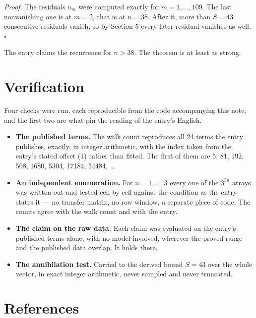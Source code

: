 \documentclass[11pt]{article}
\theoremstyle{definition}
\begin{document}
{\itshape Proof.} The residuals $u_m$ were computed exactly for $m = 1,\dots,109$. The last nonvanishing one is at $m = 2$, that is at $n = 38$. After it, more than $S = 43$ consecutive residuals vanish, so by Section 5 every later residual vanishes as well. $\square$

The entry claims the recurrence for $n > 38$. The theorem is at least as strong.

\section{Verification}

Four checks were run, each reproducible from the code accompanying this note, and the first two are what pin the reading of the entry's English.

\begin{itemize}

\item {\bfseries The published terms.} The walk count reproduces all 24 terms the entry publishes, exactly, in integer arithmetic, with the index taken from the entry's stated offset (1) rather than fitted. The first of them are 5, 81, 192, 508, 1680, 5304, 17184, 54484,~\dots

\item {\bfseries An independent enumeration.} For $n = 1,\dots,3$ every one of the $3^{3n}$ arrays was written out and tested cell by cell against the condition as the entry states it --- no transfer matrix, no row window, a separate piece of code. The counts agree with the walk count and with the entry.

\item {\bfseries The claim on the raw data.} Each claim was evaluated on the entry's published terms alone, with no model involved, wherever the proved range and the published data overlap. It holds there.

\item {\bfseries The annihilation test.} Carried to the derived bound $S = 43$ over the whole vector, in exact integer arithmetic, never sampled and never truncated.

\end{itemize}

\section{References}
\end{document}

